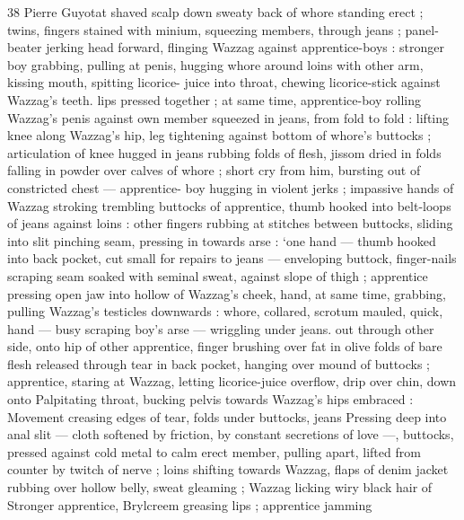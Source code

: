 38 Pierre Guyotat
shaved scalp down sweaty back of whore standing erect ; twins,
fingers stained with minium, squeezing members, through jeans ;
panel-beater jerking head forward, flinging Wazzag against
apprentice-boys : stronger boy grabbing, pulling at penis, hugging
whore around loins with other arm, kissing mouth, spitting licorice-
juice into throat, chewing licorice-stick against Wazzag's teeth. lips
pressed together ; at same time, apprentice-boy rolling Wazzag’s
penis against own member squeezed in jeans, from fold to fold :
lifting knee along Wazzag's hip, leg tightening against bottom of
whore’s buttocks ; articulation of knee hugged in jeans rubbing folds
of flesh, jissom dried in folds falling in powder over calves of whore
; short cry from him, bursting out of constricted chest — apprentice-
boy hugging in violent jerks ; impassive hands of Wazzag stroking
trembling buttocks of apprentice, thumb hooked into belt-loops of
jeans against loins : other fingers rubbing at stitches between
buttocks, sliding into slit pinching seam, pressing in towards arse :
‘one hand — thumb hooked into back pocket, cut small for repairs to
jeans — enveloping buttock, finger-nails scraping seam soaked with
seminal sweat, against slope of thigh ; apprentice pressing open jaw
into hollow of Wazzag's cheek, hand, at same time, grabbing, pulling
Wazzag's testicles downwards : whore, collared, scrotum mauled,
quick, hand — busy scraping boy's arse — wriggling under jeans.
out through other side, onto hip of other apprentice, finger brushing
over fat in olive folds of bare flesh released through tear in back
pocket, hanging over mound of buttocks ; apprentice, staring at
Wazzag, letting licorice-juice overflow, drip over chin, down onto
Palpitating throat, bucking pelvis towards Wazzag's hips embraced :
Movement creasing edges of tear, folds under buttocks, jeans
Pressing deep into anal slit — cloth softened by friction, by constant
secretions of love —, buttocks, pressed against cold metal to calm
erect member, pulling apart, lifted from counter by twitch of nerve ;
loins shifting towards Wazzag, flaps of denim jacket rubbing over
hollow belly, sweat gleaming ; Wazzag licking wiry black hair of
Stronger apprentice, Brylcreem greasing lips ; apprentice jamming

